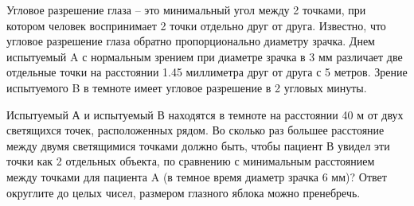
Угловое разрешение глаза – это минимальный угол
между 2 точками, при котором человек воспринимает 2 точки отдельно друг от
друга. Известно, что угловое разрешение глаза обратно пропорционально диаметру
зрачка. Днем испытуемый A с нормальным зрением при диаметре зрачка в 3  мм
различает две отдельные точки на расстоянии 1.45  миллиметра друг от друга с 5 
метров. Зрение испытуемого B в темноте имеет угловое разрешение в 2  угловых
минуты.

Испытуемый А и испытуемый В находятся в темноте на
расстоянии 40  м от двух светящихся точек, расположенных рядом.  Во сколько раз большее расстояние между двумя
светящимися точками должно быть, чтобы пациент В увидел эти точки как 2
отдельных объекта, по сравнению с минимальным расстоянием между точками для
пациента A (в темное время диаметр зрачка 6 мм)? Ответ округлите до целых
чисел, размером глазного яблока можно пренебречь.

